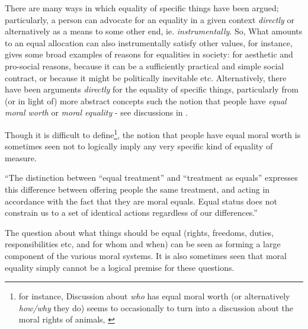 There are many ways in which equality of specific things have been argued; particularly, a person can advocate for an equality in a given context \textit{directly} or alternatively as a means to some other end, ie. \textit{instrumentally}.
So, What amounts to an equal allocation can also instrumentally satisfy other values, for instance, \cite{equalityandjustice:1998} %
gives some broad examples of reasons for equalities in society: for aesthetic and pro-social reasons, because it can be a sufficiently practical and simple social contract, or because it might be politically inevitable etc.
Alternatively, there have been arguments \textit{directly} for the equality of specific things, particularly from (or in light of) more abstract concepts such the notion that people have \textit{equal moral worth} or \textit{moral equality} - see discussions in \cite{doallpersonshaveequalmoralworth}.

Though it is difficult to define\footnote{for instance, Discussion about \textit{who} has equal moral worth (or alternatively \textit{how/why} they do) seems to occasionally to turn into a discussion about the moral rights of animals, \cite{doallpersonshaveequalmoralworth}}, the notion that people have equal moral worth is sometimes seen not to logically imply any very specific kind of equality of measure.
\begin{displayquote}
``The distinction between ``equal treatment'' and ``treatment as equals'' expresses this difference between offering people the same treatment, and acting in accordance with the fact that they are moral equals. Equal status does not constrain us to a set of identical actions regardless of our differences.'' \citep{whatisbasicequalitynathan}
\end{displayquote}

The question about what things should be equal (rights, freedoms, duties, responsibilities etc, and for whom and when) can be seen as forming a large component of the various moral systems.
It is also sometimes seen that moral equality simply cannot be a logical premise for these questions.

